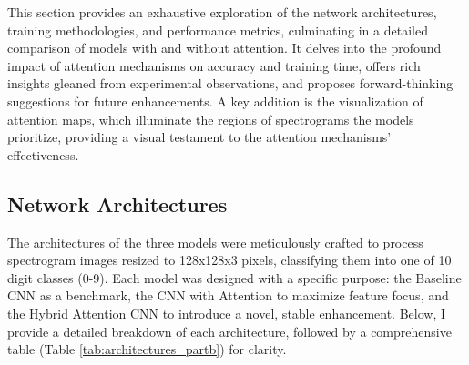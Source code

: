 \documentclass[12pt]{article}
\begin{document}
This section provides an exhaustive exploration of the network architectures, training methodologies, and performance metrics, culminating in a detailed comparison of models with and without attention. It delves into the profound impact of attention mechanisms on accuracy and training time, offers rich insights gleaned from experimental observations, and proposes forward-thinking suggestions for future enhancements. A key addition is the visualization of attention maps, which illuminate the regions of spectrograms the models prioritize, providing a visual testament to the attention mechanisms' effectiveness.

\subsection{Network Architectures}
The architectures of the three models were meticulously crafted to process spectrogram images resized to 128x128x3 pixels, classifying them into one of 10 digit classes (0-9). Each model was designed with a specific purpose: the Baseline CNN as a benchmark, the CNN with Attention to maximize feature focus, and the Hybrid Attention CNN to introduce a novel, stable enhancement. Below, I provide a detailed breakdown of each architecture, followed by a comprehensive table (Table \ref{tab:architectures_partb}) for clarity.
\end{document}
